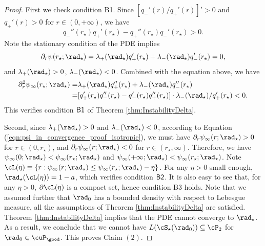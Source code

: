 \documentclass[11pt]{article}
\begin{document}
\begin{proof}
First we check condition {\sf B1}. Since $[q_-'(r)/q_+'(r)]' > 0$ and $q_+'(r) > 0$ for $r \in (0, +\infty)$, we have
\begin{equation}
q_-''(r_\star) q_+'(r_\star) - q_+''(r_\star) q_-'(r_\star) > 0. 
\end{equation}
Note the stationary condition of the PDE implies
\begin{equation}
\partial_r \psi(r_\star; \rad_\star) = \lambda_+(\rad_\star) q_+'(r_\star) + \lambda_-(\rad_\star) q_-'(r_\star) = 0,
\end{equation}
and $\lambda_+(\rad_\star) > 0$, $\lambda_-(\rad_\star) < 0$. Combined with the equation above, we have
\begin{equation}
\begin{aligned}
\partial_r^2 \psi_\infty(r_\star; \rad_\star) =& \lambda_+(\rad_\star) q_+''(r_\star) + \lambda_-(\rad_\star) q_-''(r_\star) \\
=&[q_+'(r_\star) q_-''(r_\star) - q_-'(r_\star) q_+''(r_\star)] \cdot \lambda_-(\rad_\star)/ q_+'(r_\star) < 0.
\end{aligned}
\end{equation}
This verifies condition ${\sf B1}$ of Theorem \ref{thm:InstabilityDelta}.

Second, since $\lambda_+(\rad_\star) > 0$ and $\lambda_-(\rad_\star) < 0$, according to Equation (\ref{eqn:psi_in_convergence_proof_isotropic}), we must have $\partial_r \psi_\infty(r; \rad_\star) > 0$ for $r \in (0, r_\star)$, and $\partial_r \psi_\infty(r; \rad_\star) < 0$ for $r \in (r_\star, \infty)$. Therefore, we have $\psi_\infty(0; \rad_\star) < \psi_\infty(r_\star; \rad_\star)$ and $\psi_\infty(+\infty; \rad_\star) < \psi_\infty(r_\star; \rad_\star)$. Note $\cL(\eta) \equiv \{ r: \psi_\infty (r; \rad_\star) \le \psi_\infty(r_\star; \rad_\star) - \eta \}$. For any $\eta > 0$ small enough, $\rad_\star(\cL(\eta)) = 1 - a$, which verifies condition ${\sf B2}$. It is also easy to see that, for any $\eta > 0$, $\partial \cL(\eta)$ is a compact set, hence condition {\sf B3} holds. Note that we assumed further that $\rad_0$ has a bounded density with respect to Lebesgue measure, all the assumptions of Theorem \ref{thm:InstabilityDelta} are satisfied. Theorem \ref{thm:InstabilityDelta} implies that the PDE cannot converge to $\rad_\star$. As a result, we conclude that we cannot have $L(\cS_\star(\rad_0)) \subseteq \cP_2$ for $\rad_0 \in \cuP_{\good}$. This proves Claim $(2)$. 


\end{proof}
\end{document}
